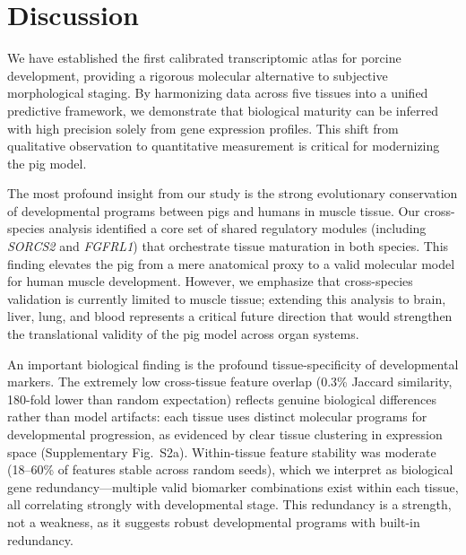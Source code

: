 \section{Discussion}

We have established the first calibrated transcriptomic atlas for porcine development, providing a rigorous molecular alternative to subjective morphological staging. By harmonizing data across five tissues into a unified predictive framework, we demonstrate that biological maturity can be inferred with high precision solely from gene expression profiles. This shift from qualitative observation to quantitative measurement is critical for modernizing the pig model.

The most profound insight from our study is the strong evolutionary conservation of developmental programs between pigs and humans in muscle tissue. Our cross-species analysis identified a core set of shared regulatory modules (including \textit{SORCS2} and \textit{FGFRL1}) that orchestrate tissue maturation in both species. This finding elevates the pig from a mere anatomical proxy to a valid molecular model for human muscle development. However, we emphasize that cross-species validation is currently limited to muscle tissue; extending this analysis to brain, liver, lung, and blood represents a critical future direction that would strengthen the translational validity of the pig model across organ systems.

An important biological finding is the profound tissue-specificity of developmental markers. The extremely low cross-tissue feature overlap (0.3\% Jaccard similarity, 180-fold lower than random expectation) reflects genuine biological differences rather than model artifacts: each tissue uses distinct molecular programs for developmental progression, as evidenced by clear tissue clustering in expression space (Supplementary Fig.~S2a). Within-tissue feature stability was moderate (18--60\% of features stable across random seeds), which we interpret as biological gene redundancy---multiple valid biomarker combinations exist within each tissue, all correlating strongly with developmental stage. This redundancy is a strength, not a weakness, as it suggests robust developmental programs with built-in redundancy.

